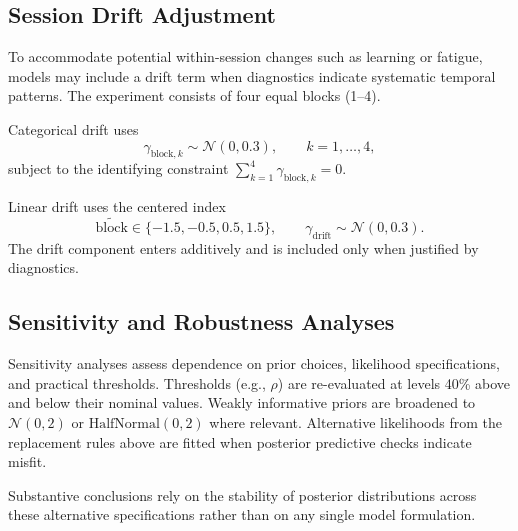 \documentclass[11pt,a4paper]{article}
\numberwithin{equation}{section}
\begin{document}
\subsection{Session Drift Adjustment} 
To accommodate potential within-session changes such as learning or fatigue, 
models may include a drift term when diagnostics indicate systematic temporal 
patterns. The experiment consists of four equal blocks (1--4).

Categorical drift uses
\[
\gamma_{\text{block},k}\sim\mathcal{N}(0,0.3),
\qquad
k=1,\dots,4,
\]
subject to the identifying constraint $\sum_{k=1}^{4}\gamma_{\text{block},k}=0$.

Linear drift uses the centered index
\[
\widetilde{\text{block}}\in\{-1.5,-0.5,0.5,1.5\},
\qquad
\gamma_{\text{drift}}\sim\mathcal{N}(0,0.3).
\]
The drift component enters additively and is included only when justified by 
diagnostics.

\subsection{Sensitivity and Robustness Analyses}  
Sensitivity analyses assess dependence on prior choices, likelihood 
specifications, and practical thresholds.  
Thresholds (e.g., $\rho$) are re-evaluated at levels 40\% above and below their 
nominal values. Weakly informative priors are broadened to $\mathcal{N}(0,2)$ or 
$\mathrm{HalfNormal}(0,2)$ where relevant.  
Alternative likelihoods from the replacement rules above are fitted when 
posterior predictive checks indicate misfit.

Substantive conclusions rely on the stability of posterior distributions across 
these alternative specifications rather than on any single model formulation.



%
%
\end{document}
